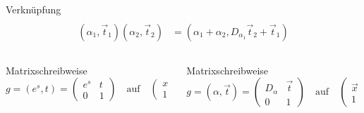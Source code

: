 \begin{frame}[t]
\begin{columns}[t,onlytextwidth]
\begin{column}{0.48\textwidth}
\begin{block}{Verknüpfung}
\begin{align*}
\\
(\alpha_1,\vec{t}_1)
(\alpha_2,\vec{t}_2)
&=
(\alpha_1+\alpha_2, D_{\alpha_1}\vec{t}_2+\vec{t}_1)
\end{align*}
\end{block}
\end{column}
\end{columns}
\vspace{-10pt}
\begin{columns}[t,onlytextwidth]
\begin{column}{0.48\textwidth}
\begin{block}{Matrixschreibweise}
\vspace{-12pt}
\[
g=(e^s,t) =
\begin{pmatrix}
e^s&t\\
0&1
\end{pmatrix}
\quad\text{auf}\quad
\begin{pmatrix}x\\1\end{pmatrix}
\]
\end{block}
\end{column}
\begin{column}{0.48\textwidth}
\begin{block}{Matrixschreibweise}
\vspace{-12pt}
\[
g=(\alpha,\vec{t}) =
\begin{pmatrix}
D_{\alpha}&\vec{t}\\
0&1
\end{pmatrix}
\quad\text{auf}\quad
\begin{pmatrix}\vec{x}\\1\end{pmatrix}
\]
\end{block}
\end{column}
\end{columns}
\end{frame}
\egroup
